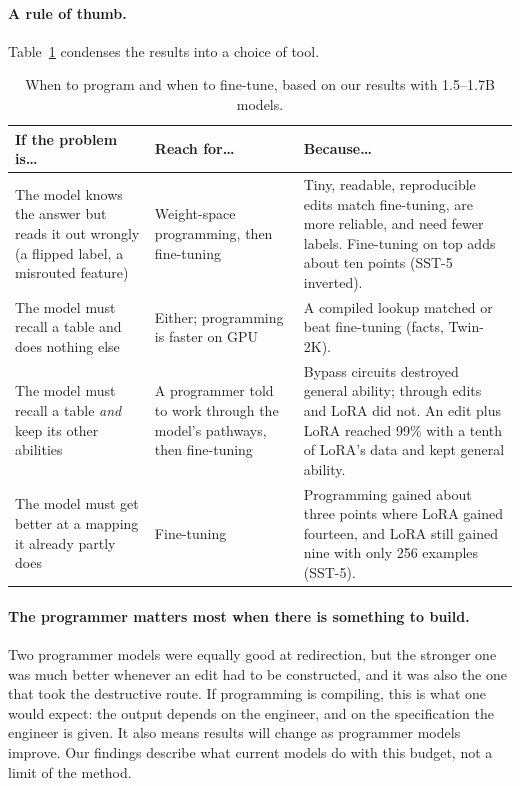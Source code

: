 \paragraph{A rule of thumb.} Table~\ref{tab:guide} condenses the results into a choice of tool.

\begin{table}[h]
\centering\small
\begin{tabular}{p{4.4cm}p{3.6cm}p{5.8cm}}
\toprule
If the problem is\ldots & Reach for\ldots & Because\ldots \\
\midrule
The model knows the answer but reads it out wrongly (a flipped label, a misrouted feature) & Weight-space programming, then fine-tuning & Tiny, readable, reproducible edits match fine-tuning, are more reliable, and need fewer labels. Fine-tuning on top adds about ten points (SST-5 inverted). \\
\addlinespace
The model must recall a table and does nothing else & Either; programming is faster on GPU & A compiled lookup matched or beat fine-tuning (facts, Twin-2K). \\
\addlinespace
The model must recall a table \emph{and} keep its other abilities & A programmer told to work through the model's pathways, then fine-tuning & Bypass circuits destroyed general ability; through edits and LoRA did not. An edit plus LoRA reached 99\% with a tenth of LoRA's data and kept general ability. \\
\addlinespace
The model must get better at a mapping it already partly does & Fine-tuning & Programming gained about three points where LoRA gained fourteen, and LoRA still gained nine with only 256 examples (SST-5). \\
\bottomrule
\end{tabular}
\caption{When to program and when to fine-tune, based on our results with 1.5--1.7B models.}
\label{tab:guide}
\end{table}

\paragraph{The programmer matters most when there is something to build.} Two programmer models were equally good at redirection, but the stronger one was much better whenever an edit had to be constructed, and it was also the one that took the destructive route. If programming is compiling, this is what one would expect: the output depends on the engineer, and on the specification the engineer is given. It also means results will change as programmer models improve. Our findings describe what current models do with this budget, not a limit of the method.

